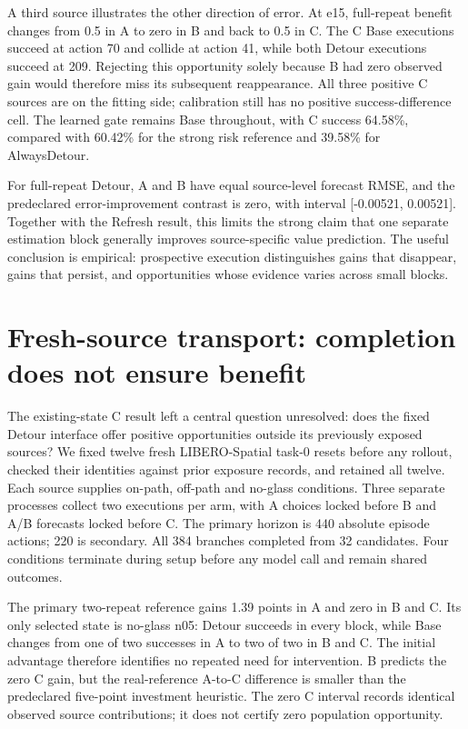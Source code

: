 A third source illustrates the other direction of error. At e15, full-repeat benefit changes from 0.5 in A to zero in B and back to 0.5 in C. The C Base executions succeed at action 70 and collide at action 41, while both Detour executions succeed at 209. Rejecting this opportunity solely because B had zero observed gain would therefore miss its subsequent reappearance. All three positive C sources are on the fitting side; calibration still has no positive success-difference cell. The learned gate remains Base throughout, with C success 64.58\%, compared with 60.42\% for the strong risk reference and 39.58\% for AlwaysDetour.


For full-repeat Detour, A and B have equal source-level forecast RMSE, and the predeclared error-improvement contrast is zero, with interval [-0.00521, 0.00521]. Together with the Refresh result, this limits the strong claim that one separate estimation block generally improves source-specific value prediction. The useful conclusion is empirical: prospective execution distinguishes gains that disappear, gains that persist, and opportunities whose evidence varies across small blocks.


\section{Fresh-source transport: completion does not ensure benefit}

The existing-state C result left a central question unresolved: does the fixed Detour interface offer positive opportunities outside its previously exposed sources? We fixed twelve fresh LIBERO-Spatial task-0 resets before any rollout, checked their identities against prior exposure records, and retained all twelve. Each source supplies on-path, off-path and no-glass conditions. Three separate processes collect two executions per arm, with A choices locked before B and A/B forecasts locked before C. The primary horizon is 440 absolute episode actions; 220 is secondary. All 384 branches completed from 32 candidates. Four conditions terminate during setup before any model call and remain shared outcomes.


The primary two-repeat reference gains 1.39 points in A and zero in B and C. Its only selected state is no-glass n05: Detour succeeds in every block, while Base changes from one of two successes in A to two of two in B and C. The initial advantage therefore identifies no repeated need for intervention. B predicts the zero C gain, but the real-reference A-to-C difference is smaller than the predeclared five-point investment heuristic. The zero C interval records identical observed source contributions; it does not certify zero population opportunity.


